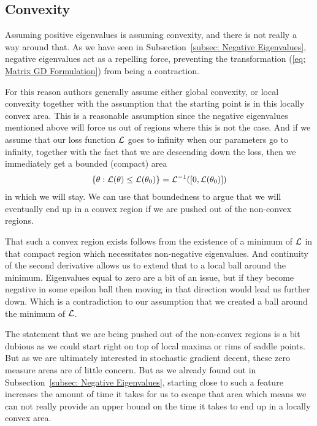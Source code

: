 \subsection{Convexity}

Assuming positive eigenvalues is assuming convexity, and there is not really a
way around that. As we have seen in Subsection~\ref{subsec: Negative
Eigenvalues}, negative eigenvalues act as a repelling force, preventing the
transformation (\ref{eq: Matrix GD Formulation}) from being a contraction.

For this reason authors generally assume either global convexity, or local
convexity together with the assumption that the starting point is in this
locally convex area. This is a reasonable assumption since the negative
eigenvalues mentioned above will force us out of regions where this is not
the case. And if we assume that our loss function \(\mathcal{L}\) goes to infinity when
our parameters go to infinity, together with the fact that we are descending
down the loss, then we immediately get a bounded (compact) area 
%
\begin{align*}
	\{\theta : \mathcal{L}(\theta) \le \mathcal{L}(\theta_0)\} = \mathcal{L}^{-1}([0, \mathcal{L}(\theta_0)])
\end{align*}
%
in which we will stay. We can use that boundedness to argue that we will
eventually end up in a convex region if we are pushed out of the non-convex
regions.

That such a convex region exists follows from the existence of a minimum of
\(\mathcal{L}\) in that compact region which necessitates non-negative
eigenvalues. And continuity of the second derivative allows us to extend that to 
a local ball around the minimum. Eigenvalues equal to zero
are a bit of an issue, but if they become negative in some epsilon ball
then moving in that direction would lead us further down. Which is a contradiction
to our assumption that we created a ball around the minimum of \(\mathcal{L}\).

The statement that we are being pushed out of the non-convex regions is a bit
dubious as we could start right on top of local maxima or rims of saddle points.
But as we are ultimately interested in stochastic gradient decent, these zero
measure areas are of little concern. But as we already found out in
Subsection~\ref{subsec: Negative Eigenvalues}, starting close to such a feature
increases the amount of time it takes for us to escape that area which means
we can not really provide an upper bound on the time it takes to end up in
a locally convex area.

